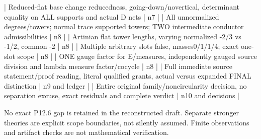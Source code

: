 \documentclass[11pt]{article}
\begin{document}
\begin{ReviewBody}
| Reduced-flat base change reducedness, going-down/novertical, determinant equality on ALL supports and actual D nets | n7 |
| All unnormalized degrees/towers; normal trace supported towers; TWO intermediate conductor admissibilities | n8 |
| Artinian flat tower lengths, varying normalized -2/3 vs -1/2, common -2 | n8 |
| Multiple arbitrary slots false, masses0/1/1/4; exact one-slot scope | n8 |
| ONE gauge factor for E/measures, independently gauged source division and lambda measure factor/cocycle | n8 |
| Full immediate source statement/proof reading, literal qualified grants, actual versus expanded FINAL distinction | n9 and ledger |
| Entire original family/noncircularity decision, no separation excuse, exact residuals and complete verdict | n10 and decisions |

No exact P12.6 gap is retained in the reconstructed draft. Separate stronger theories are explicit scope boundaries, not silently assumed. Finite observations and artifact checks are not mathematical verification.
\end{ReviewBody}
\end{document}

